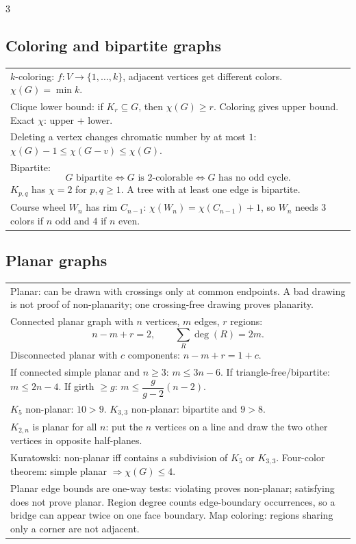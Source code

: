 \documentclass[10pt]{article}
\begin{document}
\begin{multicols*}{3}
\subsection*{Coloring and bipartite graphs}
\begin{tabular}{@{}p{}@{}}
\(k\)-coloring: \(f:V\to\{1,\dots,k\}\), adjacent vertices get different colors. \(\chi(G)=\min k\).\\
Clique lower bound: if \(K_r\subseteq G\), then \(\chi(G)\ge r\). Coloring gives upper bound. Exact \(\chi\): upper + lower.\\
Deleting a vertex changes chromatic number by at most \(1\): \(\chi(G)-1\le\chi(G-v)\le\chi(G)\).\\
Bipartite:
\[
G\text{ bipartite}\Longleftrightarrow G\text{ is }2\text{-colorable}\Longleftrightarrow G\text{ has no odd cycle}.
\]
\(K_{p,q}\) has \(\chi=2\) for \(p,q\ge1\). A tree with at least one edge is bipartite.\\
Course wheel \(W_n\) has rim \(C_{n-1}\): \(\chi(W_n)=\chi(C_{n-1})+1\), so \(W_n\) needs \(3\) colors if \(n\) odd and \(4\) if \(n\) even.\\
\end{tabular}

\subsection*{Planar graphs}
\begin{tabular}{@{}p{}@{}}
Planar: can be drawn with crossings only at common endpoints. A bad drawing is not proof of non-planarity; one crossing-free drawing proves planarity.\\
Connected planar graph with \(n\) vertices, \(m\) edges, \(r\) regions:
\[
n-m+r=2,\qquad \sum_R\deg(R)=2m.
\]
Disconnected planar with \(c\) components: \(n-m+r=1+c\).\\
If connected simple planar and \(n\ge3\): \(m\le3n-6\). If triangle-free/bipartite: \(m\le2n-4\). If girth \(\ge g\): \(m\le \dfrac{g}{g-2}(n-2)\).\\
\(K_5\) non-planar: \(10>9\). \(K_{3,3}\) non-planar: bipartite and \(9>8\).\\
\(K_{2,n}\) is planar for all \(n\): put the \(n\) vertices on a line and draw the two other vertices in opposite half-planes.\\
Kuratowski: non-planar iff contains a subdivision of \(K_5\) or \(K_{3,3}\). Four-color theorem: simple planar \(\Rightarrow \chi(G)\le4\).\\
Planar edge bounds are one-way tests: violating proves non-planar; satisfying does not prove planar. Region degree counts edge-boundary occurrences, so a bridge can appear twice on one face boundary. Map coloring: regions sharing only a corner are not adjacent.\\
\end{tabular}


\end{multicols*}
\end{document}
